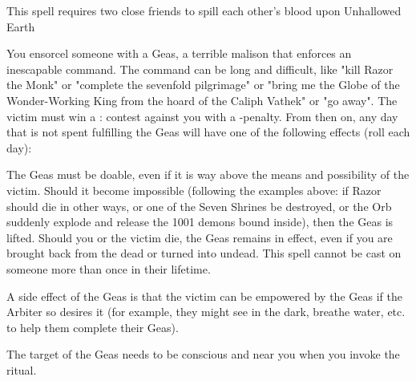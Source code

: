 {This spell requires two close friends to spill each other's blood upon Unhallowed Earth

\OCCULT[
  Name=Geas,
  Link=occultism-geas,
  Success=9,
  Cost=See below,
  Widdershins=3
]

You ensorcel someone with a Geas, a terrible malison that enforces an inescapable command. The command can be long and difficult, like "kill Razor the Monk" or "complete the sevenfold pilgrimage" or "bring me the Globe of the Wonder-Working King from the hoard of the Caliph Vathek" or "go away". The victim must win a \RB : \FOC contest against you with a -\LVL penalty.  From then on, any day that is not spent fulfilling the Geas will have one of the following effects (roll each day):


The Geas must be doable, even if it is way above the means and possibility of the victim.  Should it become impossible (following the examples above: if Razor should die in other ways, or one of the Seven Shrines be destroyed, or the Orb suddenly explode and release the 1001 demons bound inside), then the Geas is lifted.  Should you or the victim die, the Geas remains in effect, even if you are brought back from the dead or turned into undead. This spell cannot be cast on someone more than once in their lifetime.

A side effect of the Geas is that the victim can be empowered by the Geas if the Arbiter so desires it (for example, they might see in the dark, breathe water, etc. to help them complete their Geas).

The target of the Geas needs to be conscious and near you when you invoke the ritual.

}
